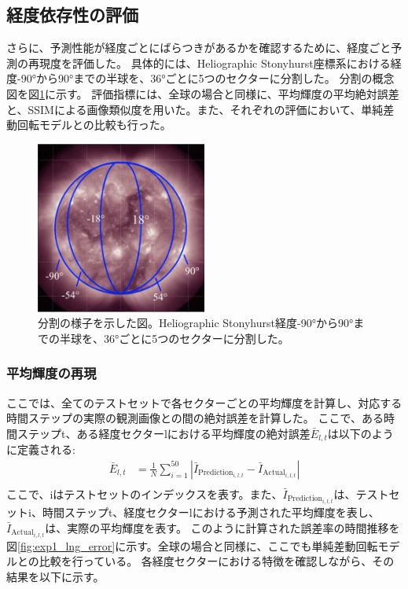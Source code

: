     \subsection{経度依存性の評価}
        さらに、予測性能が経度ごとにばらつきがあるかを確認するために、経度ごと予測の再現度を評価した。
        具体的には、Heliographic Stonyhurst座標系における経度-90°から90°までの半球を、36°ごとに5つのセクターに分割した。
        分割の概念図を図\ref{fig:exp1_division_concept}に示す。
        評価指標には、全球の場合と同様に、平均輝度の平均絶対誤差と、SSIMによる画像類似度を用いた。また、それぞれの評価において、単純差動回転モデルとの比較も行った。
        \begin{figure}[htbp]
          \centering
          \includegraphics[width=0.5\textwidth]{figures/exp1/devision_caption.jpg}
          \caption{分割の様子を示した図。Heliographic Stonyhurst経度-90°から90°までの半球を、36°ごとに5つのセクターに分割した。}
          \label{fig:exp1_division_concept}
        \end{figure}

        \subsubsection{平均輝度の再現}
          ここでは、全てのテストセットで各セクターごとの平均輝度を計算し、対応する時間ステップの実際の観測画像との間の絶対誤差を計算した。
          ここで、ある時間ステップt、ある経度セクターlにおける平均輝度の絶対誤差\( \bar{E}_{l,t} \)は以下のように定義される:
          \begin{align}
            \bar{E}_{l, t} & = \frac{1}{N} \sum_{i=1}^{50} | \bar{I}_{\text{Prediction}_ {i, l, t}} - \bar{I}_{\text{Actual}_{i, l, t}} | \\
          \end{align}
          ここで、iはテストセットのインデックスを表す。また、\( \bar{I}_{\text{Prediction}_{i, l, t}} \)は、テストセットi、時間ステップt、経度セクターlにおける予測された平均輝度を表し、\( \bar{I}_{\text{Actual}_{i, l, t}} \)は、実際の平均輝度を表す。  
          このように計算された誤差率の時間推移を図\ref{fig:exp1_lng_error}に示す。全球の場合と同様に、ここでも単純差動回転モデルとの比較を行っている。
          各経度セクターにおける特徴を確認しながら、その結果を以下に示す。
          
